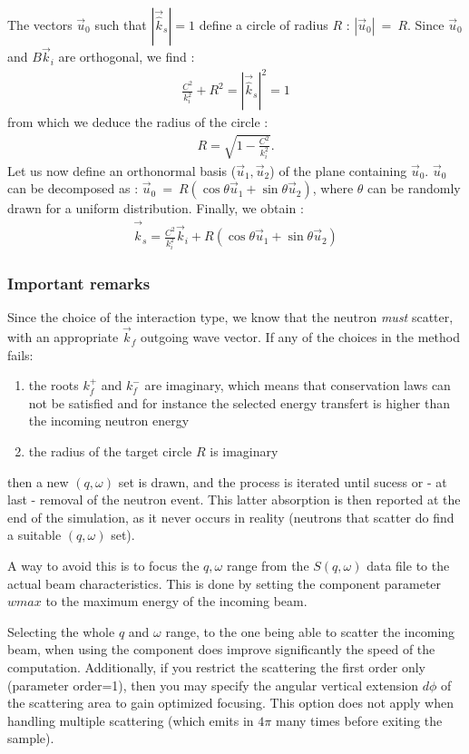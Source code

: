 The vectors $\vec{u}_0$ such that $|\vec{\hat k}_s| = 1$ define a circle of radius $R$ : $|\vec{u}_0|~=~R$.
Since $\vec{u}_0$ and $B \vec{k}_i$ are orthogonal, we find :
\begin{align}
\frac{C^2}{k_i^2} + R^2 = |\vec{\hat k}_s|^2 = 1
\end{align}
from which we deduce the radius of the circle :
\begin{align}
R = \sqrt{1 - \frac{C^2}{k_i^2}}.
\end{align}
Let us now define an orthonormal basis ($\vec{u}_1,\vec{u}_2$) of the plane containing $\vec{u}_0$.
$\vec{u}_0$ can be decomposed as : $\vec{u}_0~=~R(\cos \theta \vec{u}_1 + \sin \theta \vec{u}_2)$, where $\theta$ can be randomly drawn for a uniform distribution.
Finally, we obtain :
\begin{align}
\vec{\hat k}_s = \frac{C^2}{k_i^2} \vec{k}_i + R (\cos \theta \vec{u}_1 + \sin \theta \vec{u}_2)
\end{align}

\subsubsection{Important remarks}

Since the choice of the interaction type, we know that the neutron \emph{must} scatter, with an appropriate $\vec k_f$ outgoing wave vector. If any of the choices in the method fails:
\begin{enumerate}
\item the roots $k_f^+$ and $k_f^-$ are imaginary, which means that conservation laws can not be satisfied and for instance the selected energy transfert is higher than the incoming neutron energy
\item the radius of the target circle $R$ is imaginary
\end{enumerate}
then a new $(q, \omega)$ set is drawn, and the process is iterated until sucess or - at last - removal of the neutron event. This latter absorption is then reported at the end of the simulation, as it never occurs in reality (neutrons that scatter do find a suitable $(q, \omega)$ set).

A way to avoid this is to focus the $q,\omega$ range from the $S(q, \omega)$ data file to the actual beam characteristics. This is done by setting the component parameter $wmax$ to the maximum energy of the incoming beam.

Selecting the whole $q$ and $\omega$ range, to the one being able to scatter the incoming beam, when using the component does improve significantly the speed of the computation. Additionally, if you restrict the scattering the first order only (parameter order=1), then you may specify the angular vertical extension $d\phi$ of the scattering area to gain optimized focusing. This option does not apply when handling multiple scattering (which emits in $4\pi$ many times before exiting the sample).

